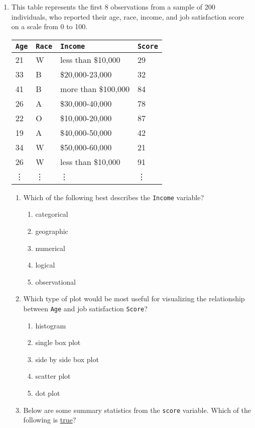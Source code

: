 \documentclass[11pt,fullpage]{amsart}
\begin{document}
\begin{enumerate}
\item This table represents the first 8 observations from a sample of 200 individuals, who reported their age, race, income, and job satisfaction score on a scale from 0 to 100.
\begin{center}
\begin{tabular}{llll}
\hline
\texttt{Age}	& \texttt{Race}	& \texttt{Income} &	\texttt{Score}\\
\hline
21	& W	& less than \$10,000	& 29 \\
33	& B	& \$20,000-23,000	& 32 \\
41	& B	& more than \$100,000	& 84 \\
26	& A	& \$30,000-40,000	& 78 \\
22	& O	& \$10,000-20,000	& 87 \\
19	& A	& \$40,000-50,000	& 42 \\
34	& W	& \$50,000-60,000	& 21 \\
26	& W	& less than \$10,000	& 91 \\
\vdots & \vdots & \vdots & \vdots  \\
\hline
\end{tabular}
\end{center}
\begin{enumerate}
\item
Which of the following best describes the \texttt{Income} variable?
\begin{enumerate}
   \item
    categorical
    \item
    geographic
    \item
    numerical
    \item
    logical
    \item
    observational
 \end{enumerate}
\item
Which type of plot would be most useful for visualizing the relationship between \texttt{Age} and job satisfaction \texttt{Score}?
\begin{enumerate}
    \item
    histogram
    \item
    single box plot
    \item
    side by side box plot
    \item
    scatter plot
    \item
    dot plot
\end{enumerate}
\item
Below are some summary statistics from the \texttt{score} variable.  Which of the following is \underline{true}?

\end{enumerate}
\end{enumerate}
\end{document}
